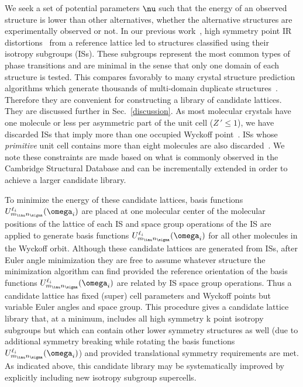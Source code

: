 \documentclass[preprint]{iucr}              %
\newcommand{\mb}[1]{\ensuremath{\mbox{\boldmath $ #1 $}}}
\begin{document}
We seek a set of potential parameters $\mb{\nu}$ such that the
energy of an observed structure is lower than other alternatives, whether the alternative structures are experimentally observed or not. In our previous work~\cite{Mettes04}, high
symmetry point IR distortions~\cite{Stokes88,Stokes07} from a
reference lattice led to structures classified using their isotropy
subgroups (ISs). These subgroups represent the most common types of
phase transitions and are minimal in the sense that only one domain
of each structure is tested. This compares favorably to many crystal
structure prediction algorithms which generate thousands of multi-domain
duplicate structures~\cite{Gavezzotti07}.  Therefore they are convenient for
constructing a library of candidate lattices. They are discussed
further in Sec.~\ref{discussion}.  As most molecular crystals have
one molecule or less per asymmetric part of the unit cell ($Z\,'\leq
1$), we have discarded ISs that imply more than one occupied Wyckoff
point~\cite{Padmaja90}. ISs whose \emph{primitive} unit cell
contains more than eight molecules are also
discarded~\cite{Gdanitz97}. We note these constraints are made based on what is commonly observed in the Cambridge Structural Database and can be incrementally extended in order to achieve a larger candidate library.


To minimize the energy of these candidate lattices,
basis functions $U^{\ell_i}_{m_\tau n_\sigma}(\mb{\omega}_i)$ are placed at one
molecular center of the molecular positions of the lattice of each
IS and space group operations of the IS are applied to generate
basis functions $U^{\ell_i}_{m_\tau n_\sigma}(\mb{\omega}_i)$ for all other molecules in the Wyckoff orbit. Although these candidate lattices are generated from ISs, after Euler angle minimization they are free to assume
whatever structure the minimization algorithm can find provided the
reference orientation of the basis functions $U^{\ell_i}_{m_\tau n_\sigma}(\mb{\omega}_i)$ are related by IS space group operations. Thus a
candidate lattice has fixed (super) cell parameters and Wyckoff
points but variable Euler angles and space group. This procedure gives a candidate lattice library that, at a minimum, includes all high symmetry k point isotropy subgroups but which can contain other lower symmetry structures as well (due to additional symmetry breaking while rotating the basis functions $U^{\ell_i}_{m_\tau n_\sigma}(\mb{\omega}_i)$) and  provided translational symmetry requirements are met.  As indicated above, this candidate library may be systematically improved by explicitly including new isotropy subgroup supercells.
\end{document}
